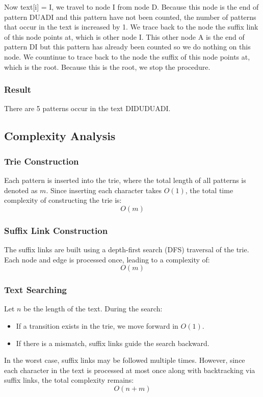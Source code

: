 Now text[i] = I, we travel to node I from node D. Because this node is the end of pattern DUADI and this pattern have not been counted, the number of patterns that occur in the text is increased by 1. We trace back to the node the suffix link of this node points at, which is other node I. This other node A is the end of pattern DI but this pattern has already been counted so we do nothing on this node. We countinue to trace back to the node the suffix of this node points at, which is the root. Because this is the root, we stop the procedure.
\subsubsection*{Result}
There are 5 patterns occur in the text DIDUDUADI.
\subsection{Complexity Analysis}
\subsubsection*{Trie Construction}
Each pattern is inserted into the trie, where the total length of all patterns is denoted as \( m \). Since inserting each character takes \( O(1) \), the total time complexity of constructing the trie is: \[ O(m) \]

\subsubsection*{Suffix Link Construction}
The suffix links are built using a depth-first search (DFS) traversal  of the trie. Each node and edge is processed once, leading to a complexity of: \[ O(m) \]

\subsubsection*{Text Searching}
Let \( n \) be the length of the text. During the search:

\begin{itemize}
    \item If a transition exists in the trie, we move forward in \( O(1) \).
    \item If there is a mismatch, suffix links guide the search backward.
\end{itemize}

\noindent In the worst case, suffix links may be followed multiple times. However, since each character in the text is processed at most once along with backtracking via suffix links, the total complexity remains: \[O(n + m)\]

